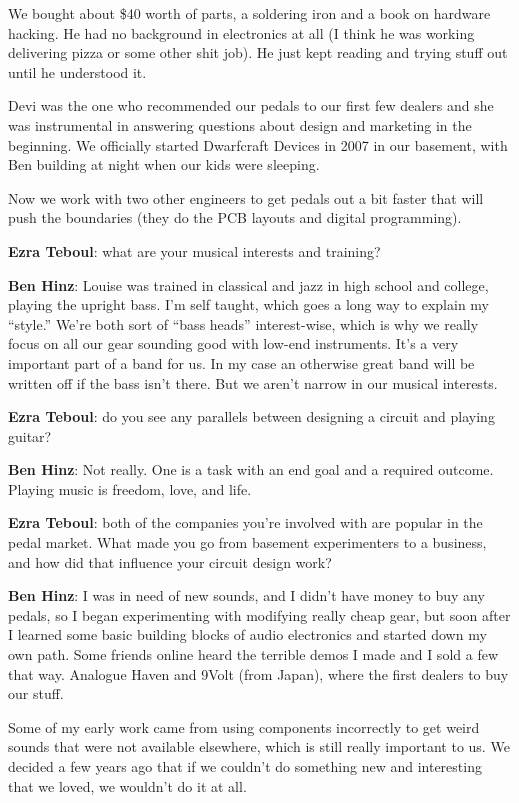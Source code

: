 We bought about \$40 worth of parts, a soldering iron and a book on
hardware hacking.  He had no background in electronics at all (I think
he was working delivering pizza or some other shit job).  He just kept
reading and trying stuff out until he understood it.

Devi was the one who recommended our pedals to our first few dealers
and she was instrumental in answering questions about design and
marketing in the beginning.  We officially started Dwarfcraft Devices
in 2007 in our basement, with Ben building at night when our kids were
sleeping.

Now we work with two other engineers to get pedals out a bit faster
that will push the boundaries (they do the PCB layouts and digital
programming).

\textbf{Ezra Teboul}: what are your musical interests and training? 

\textbf{Ben Hinz}: Louise was trained in classical and jazz in high school and college, playing
the upright bass. I'm self taught, which goes a long way to explain my ``style.'' 
We're both sort of ``bass heads'' interest-wise, which is why we really focus on all our gear sounding good with low-end instruments. It's a very important part of a band for us. In my case an otherwise great band will be written off if the bass isn’t there. But we aren’t narrow in our musical interests.

\textbf{Ezra Teboul}: do you see any parallels between designing a circuit and playing guitar? 

\textbf{Ben Hinz}: Not really. One is a task with an end goal and a required outcome. Playing music is freedom, love, and life.

\textbf{Ezra Teboul}: both of the companies you're involved with are popular in the pedal market. What made you go from basement experimenters to a business, and how did that influence your circuit design work? 

\textbf{Ben Hinz}: I was in need of new sounds, and I didn't have money to buy any pedals, so I began experimenting with modifying really cheap gear, but soon after I learned some basic building blocks of audio electronics and started down my own path. Some friends online heard the terrible demos I made and I sold a few that way. Analogue Haven and 9Volt (from Japan), where the first dealers to buy our stuff. 

Some of my early work came from using components incorrectly to get  weird sounds that were not available elsewhere, which is still really important to us. We decided a few years ago that if we couldn’t do something new and interesting that we loved, we wouldn’t do it at all. 

